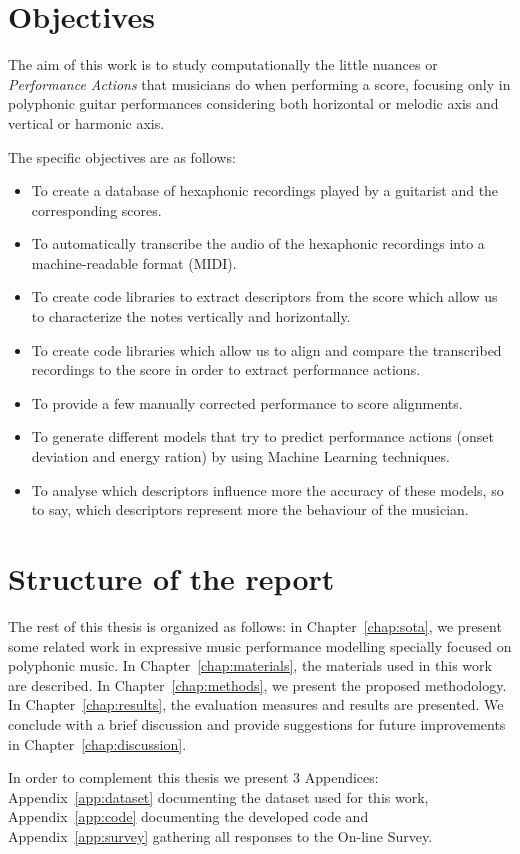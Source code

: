 \section{Objectives}
The aim of this work is to study computationally the little nuances or \textit{Performance Actions} that musicians do when performing a score, focusing only in polyphonic guitar performances considering both horizontal or melodic axis and vertical or harmonic axis.

The specific objectives are as follows:

\begin{itemize}[noitemsep]
\item To create a database of hexaphonic recordings played by a guitarist and the corresponding scores.
\item To automatically transcribe the audio of the hexaphonic recordings into a machine-readable format (MIDI).
\item To create code libraries to extract descriptors from the score which allow us to characterize the notes vertically and horizontally.
\item To create code libraries which allow us to align and compare the transcribed recordings to the score in order to extract performance actions.
\item To provide a few manually corrected performance to score alignments.
\item To generate different models that try to predict performance actions (onset deviation and energy ration) by using Machine Learning techniques.
\item To analyse which descriptors influence more the accuracy of these models, so to say, which descriptors represent more the behaviour of the musician.
\end{itemize}

\section{Structure of the report}
The rest of this thesis is organized as follows: in Chapter~\ref{chap:sota}, we present some related work in expressive music performance modelling specially focused on polyphonic music. In Chapter~\ref{chap:materials}, the materials used in this work are described. In Chapter~\ref{chap:methods}, we present the proposed methodology. In Chapter~\ref{chap:results}, the evaluation measures and results are presented. We conclude with a brief discussion and provide suggestions for future improvements in Chapter~\ref{chap:discussion}. 

In order to complement this thesis we present 3 Appendices: Appendix~\ref{app:dataset} documenting the dataset used for this work, Appendix~\ref{app:code} documenting the developed code and Appendix~\ref{app:survey} gathering all responses to the On-line Survey.
\cleardoublepage

